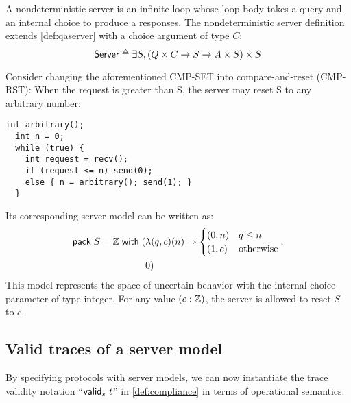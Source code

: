 \begin{definition}
  \label{def:server}
  A nondeterministic server is an infinite loop whose loop body takes a query
  and an internal choice to produce a responses.  The nondeterministic server
  definition extends \autoref{def:qaserver} with a choice argument of type $C$:
  \[\mathsf{Server}\triangleq\exists S,(Q\times C\to S\to A\times S)\times S\]
\end{definition}

Consider changing the aforementioned CMP-SET into compare-and-reset (CMP-RST):
When the request is greater than \inlinec S, the server may reset \inlinec S to
any arbitrary number:
\begin{lstlisting}[style=customc]
  int arbitrary();
  int n = 0;
  while (true) {
    int request = recv();
    if (request <= n) send(0);
    else { n = arbitrary(); send(1); }
  }
\end{lstlisting}
Its corresponding server model can be written as:
\begin{align*}
  \mathsf{pack}\;S=\mathbb Z\;\mathsf{with}\;(&\lambda(q,c)(n)\Rightarrow
      \begin{cases}
        (0,n)& q\le n\\
        (1,c)&\mathrm{otherwise}
      \end{cases}
   ,\\
    &0)
\end{align*}
This model represents the space of uncertain behavior with the internal choice
parameter of type integer.  For any value $(c:\mathbb Z)$, the server is allowed to
reset $S$ to $c$.

\subsection{Valid traces of a server model}
By specifying protocols with server models, we can now instantiate the trace
validity notation ``$\mathsf{valid}_{s}~{t}$'' in \autoref{def:compliance} in terms of
operational semantics.

